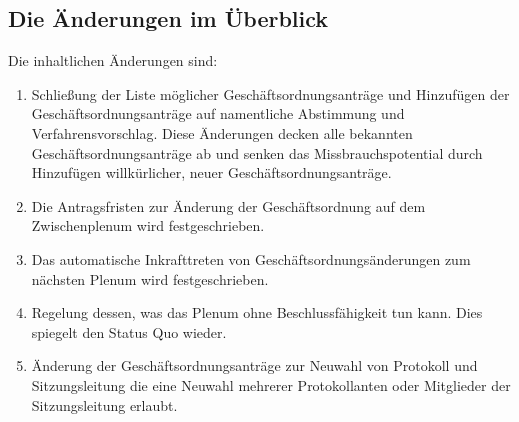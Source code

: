 \documentclass[draft,12pt,oneside]{scrartcl}
\begin{document}
\subsection*{Die Änderungen im Überblick}

Die inhaltlichen Änderungen sind:
\begin{enumerate}
\item Schließung der Liste möglicher Geschäftsordnungsanträge und Hinzufügen der
  Geschäftsordnungsanträge auf namentliche Abstimmung und
  Verfahrensvorschlag.
  Diese Änderungen decken alle bekannten Geschäftsordnungsanträge ab und
  senken das Missbrauchspotential durch Hinzufügen willkürlicher, neuer
  Geschäftsordnungsanträge.
\item Die Antragsfristen zur Änderung der Geschäftsordnung auf dem
  Zwischenplenum wird festgeschrieben.
\item Das automatische Inkrafttreten von Geschäftsordnungsänderungen zum
  nächsten Plenum wird festgeschrieben.
\item Regelung dessen, was das Plenum ohne Beschlussfähigkeit tun kann. Dies
  spiegelt den Status Quo wieder.
\item Änderung der Geschäftsordnungsanträge zur Neuwahl von Protokoll und
  Sitzungsleitung die eine Neuwahl mehrerer Protokollanten oder Mitglieder der
  Sitzungsleitung erlaubt.
\end{enumerate}
\end{document}
